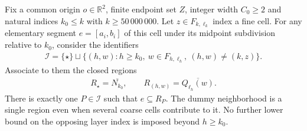 \begin{lemma}
    \label{thm:area_law_unique_elementary_side_opponent}
    \leanok
    Fix a common origin $o\in\mathbb R^2$, finite endpoint set $Z$,
    integer width $C_0\ge2$ and natural indices $k_0\le k$ with
    $k\ge50\,000\,000$. Let $z\in F_{k,\ell_k}$ index a fine
    cell. For any elementary segment $e=[a_i,b_i]$ of this cell under
    its midpoint subdivision relative to $k_0$, consider the
    identifiers
    \begin{align}
        \mathcal I=\{\star\}\sqcup
        \{(h,w):h\ge k_0,\ w\in F_{h,\ell_h},\ (h,w)\ne(k,z)\}.
    \end{align}
    Associate to them the closed regions
    \begin{align}
        R_\star=\overline{N_{k_0}},\qquad
        R_{(h,w)}=\overline{Q_{\ell_h}(w)}.
    \end{align}
    There is exactly one $P\in\mathcal I$ such that $e\subseteq R_P$.
    The dummy neighborhood is a single region even when several coarse
    cells contribute to it. No further lower bound on the opposing
    layer index is imposed beyond $h\ge k_0$.
\end{lemma}
